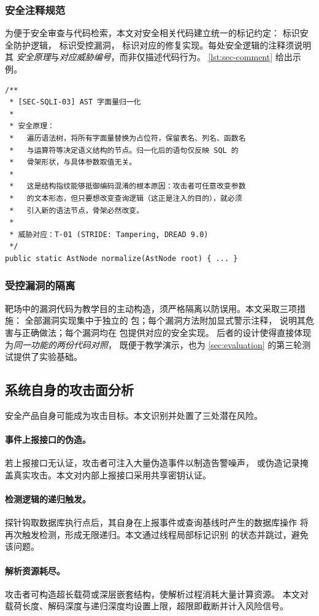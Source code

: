 \subsubsection{安全注释规范}

为便于安全审查与代码检索，本文对安全相关代码建立统一的标记约定：
 标识安全防护逻辑，\code{[VULN-nn]} 标识受控漏洞，
\code{[FIX-nn]} 标识对应的修复实现。每处安全逻辑的注释须说明其
\emph{安全原理}与\emph{对应威胁编号}，而非仅描述代码行为。
\cref{lst:sec-comment} 给出示例。

\begin{lstlisting}[style=javastyle, caption={安全注释规范示例}, label={lst:sec-comment}]
/**
 * [SEC-SQLI-03] AST 字面量归一化
 *
 * 安全原理：
 *   遍历语法树，将所有字面量替换为占位符，保留表名、列名、函数名
 *   与运算符等决定语义结构的节点。归一化后的语句仅反映 SQL 的
 *   骨架形状，与具体参数取值无关。
 *
 *   这是结构指纹能够抵御编码混淆的根本原因：攻击者可任意改变参数
 *   的文本形态，但只要想改变查询逻辑（这正是注入的目的），就必须
 *   引入新的语法节点，骨架必然改变。
 *
 * 威胁对应：T-01 (STRIDE: Tampering, DREAD 9.0)
 */
public static AstNode normalize(AstNode root) { ... }
\end{lstlisting}

\subsubsection{受控漏洞的隔离}

靶场中的漏洞代码为教学目的主动构造，须严格隔离以防误用。本文采取三项措施：
全部漏洞实现集中于独立的  包；每个漏洞方法附加显式警示注释，
说明其危害与正确做法；每个漏洞均在  包提供对应的安全实现。
后者的设计使得直接体现为\emph{同一功能的两份代码对照}，
既便于教学演示，也为 \cref{sec:evaluation} 的第三轮测试提供了实验基础。

\subsection{系统自身的攻击面分析}

安全产品自身可能成为攻击目标。本文识别并处置了三处潜在风险。

\paragraph{事件上报接口的伪造。}
若上报接口无认证，攻击者可注入大量伪造事件以制造告警噪声，
或伪造记录掩盖真实攻击。本文对内部上报接口采用共享密钥认证。

\paragraph{检测逻辑的递归触发。}
探针钩取数据库执行点后，其自身在上报事件或查询基线时产生的数据库操作
将再次触发检测，形成无限递归。本文通过线程局部标记识别
的状态并跳过，避免该问题。

\paragraph{解析资源耗尽。}
攻击者可构造超长载荷或深层嵌套结构，使解析过程消耗大量计算资源。
本文对载荷长度、解码深度与递归深度均设置上限，超限即截断并计入风险信号。

